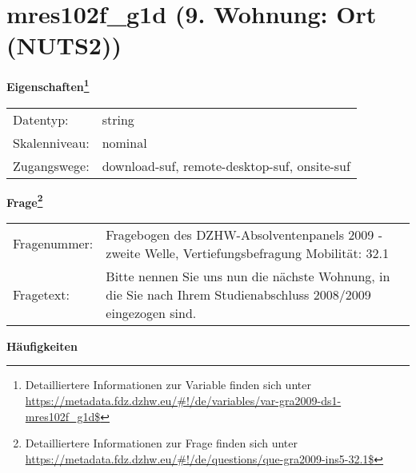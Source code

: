 
    \setcounter{footnote}{0}

    \vspace*{-1.8cm}
	\section{mres102f\_g1d (9. Wohnung: Ort (NUTS2))}
	\label{section:mres102f_g1d}



    \vspace*{0.5cm}
    \noindent\textbf{Eigenschaften\footnote{Detailliertere Informationen zur Variable finden sich unter
		\url{https://metadata.fdz.dzhw.eu/\#!/de/variables/var-gra2009-ds1-mres102f_g1d$}}}\\
	\begin{tabularx}{\hsize}{@{}lX}
	Datentyp: & string \\
	Skalenniveau: & nominal \\
	Zugangswege: &
	  download-suf, 
	  remote-desktop-suf, 
	  onsite-suf
 \\
    \end{tabularx}



				\vspace*{0.5cm}
                \noindent\textbf{Frage\footnote{Detailliertere Informationen zur Frage finden sich unter
		              \url{https://metadata.fdz.dzhw.eu/\#!/de/questions/que-gra2009-ins5-32.1$}}}\\
				\begin{tabularx}{\hsize}{@{}lX}
					Fragenummer: &
					  Fragebogen des DZHW-Absolventenpanels 2009 - zweite Welle, Vertiefungsbefragung Mobilität:
					  32.1
 \\
					Fragetext: & Bitte nennen Sie uns nun die nächste Wohnung, in die Sie nach Ihrem Studienabschluss 2008/2009 eingezogen sind. \\
				\end{tabularx}





        		\vspace*{0.5cm}
                \noindent\textbf{Häufigkeiten}

